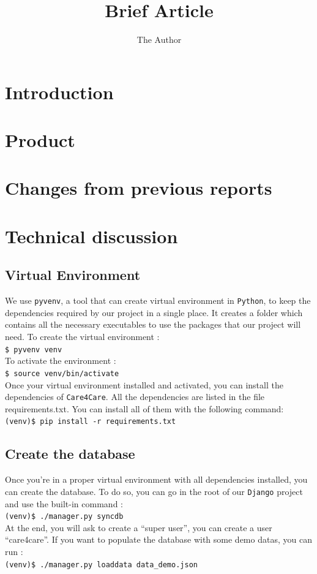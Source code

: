 \documentclass[11pt, a4paper]{article}   	%
\title{Brief Article}
\author{The Author}
\newcommand{\shellcmd}[1]{\\\indent\indent\texttt{\footnotesize\$ #1}\\}
\newcommand{\vshellcmd}[1]{\\\indent\indent\texttt{\footnotesize(venv)\$ #1}\\}
\begin{document}

\section{Introduction}

\section{Product}






\section{Changes from previous reports}

\section{Technical discussion}

\subsection{Virtual Environment}

We use \texttt{pyvenv}, a tool that can create virtual environment in \texttt{Python}, to keep the dependencies required by our project in a single place. It creates a folder which contains all the necessary executables to use the packages that our project will need. To create the virtual environment :
\shellcmd{pyvenv venv}
To activate the environment :
\shellcmd{source venv/bin/activate}
Once your virtual environment installed and activated, you can install the dependencies of \texttt{Care4Care}. All the dependencies are listed in the file requirements.txt. You can install all of them with the following command:
\vshellcmd{pip install -r requirements.txt}

\subsection{Create the database}
Once you're in a proper virtual environment with all dependencies installed, you can create the database. To do so, you can go in the root of our \texttt{Django} project and use the built-in command :
\vshellcmd{./manager.py syncdb}
At the end, you will ask to create a ``super user'', you can create a user ``care4care''. If you want to populate the database with some demo datas, you can run :
\vshellcmd{./manager.py loaddata data\_demo.json}
\end{document}
